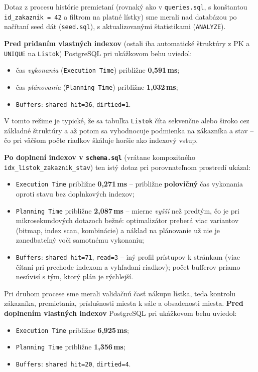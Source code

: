 \documentclass[11pt, a4paper]{article}
\begin{document}
Dotaz z procesu histórie premietaní (rovnaký ako v \texttt{queries.sql}, s konštantou \texttt{id\_zakaznik = 42} a filtrom na platné lístky) sme merali nad databázou po načítaní seed dát (\texttt{seed.sql}), s aktualizovanými štatistikami (\texttt{ANALYZE}).

\textbf{Pred pridaním vlastných indexov} (ostali iba automatické štruktúry z PK a \texttt{UNIQUE} na \texttt{Listok}) PostgreSQL pri ukážkovom behu uviedol:
\begin{itemize}
    \item čas \emph{vykonania} (\texttt{Execution Time}) približne \textbf{0{,}591\,ms};
    \item čas \emph{plánovania} (\texttt{Planning Time}) približne \textbf{1{,}032\,ms};
    \item \texttt{Buffers}: \texttt{shared hit=36}, \texttt{dirtied=1}.
\end{itemize}
V tomto režime je typické, že sa tabuľka \texttt{Listok} číta sekvenčne alebo široko cez základné štruktúry a až potom sa vyhodnocuje podmienka na zákazníka a stav -- čo pri väčšom počte riadkov škáluje horšie ako indexový vstup.

\textbf{Po doplnení indexov v \texttt{schema.sql}} (vrátane kompozitného \texttt{idx\_listok\_zakaznik\_stav}) ten istý dotaz pri porovnateľnom prostredí ukázal:
\begin{itemize}
    \item \texttt{Execution Time} približne \textbf{0{,}271\,ms} -- približne \textbf{polovičný} čas vykonania oproti stavu bez doplnkových indexov;
    \item \texttt{Planning Time} približne \textbf{2{,}087\,ms} -- mierne \emph{vyšší} než predtým, čo je pri mikrosekundových dotazoch bežné: optimalizátor preberá viac variantov (bitmap, index scan, kombinácie) a náklad na plánovanie už nie je zanedbateľný voči samotnému vykonaniu;
    \item \texttt{Buffers}: \texttt{shared hit=71}, \texttt{read=3} -- iný profil prístupov k stránkam (viac čítaní pri prechode indexom a vyhľadaní riadkov); počet bufferov priamo nesúvisí s tým, ktorý plán je rýchlejší.
\end{itemize}

Pri druhom procese sme merali validačnú časť nákupu lístka, teda kontrolu zákazníka, premietania, príslušnosti miesta k sále a obsadenosti miesta.
\textbf{Pred doplnením vlastných indexov} PostgreSQL pri ukážkovom behu uviedol:
\begin{itemize}
    \item \texttt{Execution Time} približne \textbf{6{,}925\,ms};
    \item \texttt{Planning Time} približne \textbf{1{,}356\,ms};
    \item \texttt{Buffers}: \texttt{shared hit=20}, \texttt{dirtied=4}.
\end{itemize}
\end{document}
